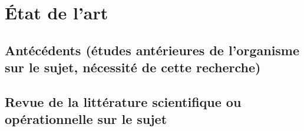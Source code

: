 \chapter{État de l'art}
\label{sec:soa}

\section{Antécédents (études antérieures de l'organisme sur le sujet, nécessité de cette recherche)}
    \lipsum[1-2]

\section{Revue de la littérature scientifique ou opérationnelle sur le sujet}
    \lipsum[1-2]
